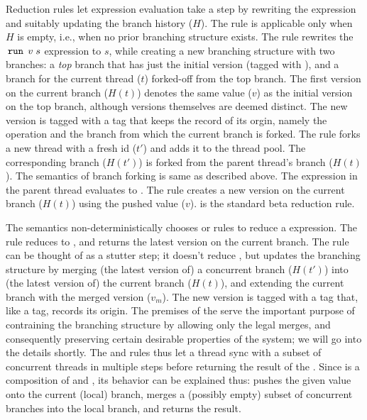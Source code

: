 Reduction rules let expression evaluation take a step by rewriting the
expression and suitably updating the branch history ($H$). The
 rule is applicable only when $H$ is empty, i.e.,
when no prior branching structure exists. The rule rewrites the
$\,{\tt run}\,\;v\;s$ expression to $s$, while creating a new branching
structure with two branches: a \emph{top} branch that has just the
initial version (tagged with ), and a branch for the current
thread ($t$) forked-off from the top branch.  The first version on the
current branch ($H(t)$) denotes the same value ($v$) as the initial
version on the top branch, although versions themselves are deemed
distinct. The new version is tagged with a  tag that keeps the
record of its orgin, namely the  operation and the branch from
which the current branch is forked. The  rule forks
a new thread with a fresh id ($t'$) and adds it to the thread pool.
The corresponding branch ($H(t')$) is forked from the parent thread's
branch ($H(t)$). The semantics of branch forking is same as described
above. The  expression in the parent thread evaluates to
\C{()}. The  rule creates a new version on the
current branch ($H(t)$) using the pushed value ($v$).
 is the standard beta reduction rule.

The semantics non-deterministically chooses  or
 rules to reduce a  expression. The
 rule reduces  to \C{()}, and returns the
latest version on the current branch. The  rule
can be thought of as a stutter step; it doesn't reduce , but
updates the branching structure by merging (the latest version of) a
concurrent branch ($H(t')$) into (the latest version of) the current
branch ($H(t)$), and extending the current branch with the merged
version ($v_m$). The new version is tagged with a  tag that,
like a  tag, records its origin. The premises of the
 serve the important purpose of contraining the
branching structure by allowing only the legal merges, and
consequently preserving certain desirable properties of the system;
we will go into the details shortly. The  and
 rules thus let a thread sync with a subset of
concurrent threads in multiple steps before returning the result of
the . Since  is a composition of  and
, its behavior can be explained thus:  pushes the
given value onto the current (local) branch, merges a (possibly empty)
subset of concurrent branches into the local branch, and returns the
result.


